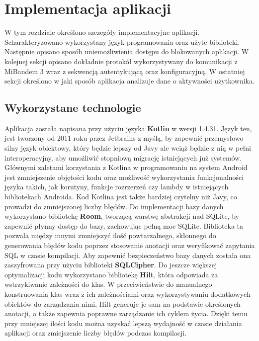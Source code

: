 \chapter{Implementacja aplikacji}
\thispagestyle{chapterBeginStyle}
\label{rozdzial3}
W tym rozdziale określono szczegóły implementacyjne aplikacji. Scharakteryzowano wykorzystany język programowania oraz użyte biblioteki. Następnie opisano sposób uniemożliwienia dostępu do blokowanych aplikacji. W kolejnej sekcji opisano dokładnie protokół wykorzystywany do komunikacji z MiBandem 3 wraz z sekwencją autentykującą oraz konfiguracyjną. W ostatniej sekcji określono w jaki sposób aplikacja analizuje dane o aktywności użytkownika.

\section{Wykorzystane technologie}
Aplikacja została napisana przy użyciu języka \textbf{Kotlin} w wersji 1.4.31. Język ten, jest tworzony od 2011 roku przez Jetbrains z myślą, by zapewnić przemysłowo silny język obiektowy, który będzie lepszy od Javy ale wciąż będzie z nią w pełni interoperacyjny, aby umożliwić stopniową migrację istniejących już systemów. Głównymi zaletami korzystania z Kotlina w programowaniu na system Android jest zmniejszenie objętości kodu oraz możliwość wykorzystania funkcjonalności języka takich, jak korutyny, funkcje rozrzerzeń czy lambdy w istniejących bibliotekach Androida. Kod Kotlina jest także bardziej czytelny niż Javy, co prowadzi do zmniejszonej liczby błędów. 
\newline\newline
\indent Do implementacji bazy danych wykorzystano bibliotekę \textbf{Room}, tworzącą warstwę abstrakcji nad SQLite, by zapewnić płynny dostęp do bazy, zachowując pełną moc SQLite. Biblioteka ta pozwala między innymi zmniejszyć ilość powtarzalnego, skłonnego do generowania błędów kodu poprzez stosowanie anotacji oraz weryfikować zapytania SQL w czasie kompilacji. Aby zapewnić bezpieczeństwo bazy danych została ona zaszyfrowana przy użyciu biblioteki \textbf{SQLCipher}.
\newline\newline
\indent Do jeszcze większej optymalizacji kodu wykorzystano bibliotekę \textbf{Hilt}, która odpowiada za wstrzykiwanie zależności do klas. W przeciwieństwie do manualnego konstruowania klas wraz z ich zależnościami oraz wykorzystywaniu dodatkowych obiektów do zarządzania nimi, Hilt generuje je sam na podstawie określonych anotacji, a także zapewnia poprawne zarządzanie ich cyklem życia. Dzięki temu przy mniejszej ilości kodu można uzyskać lepszą wydajność w czasie działania aplikacji oraz zmiejszenie liczby błędów podczas kompilacji.
